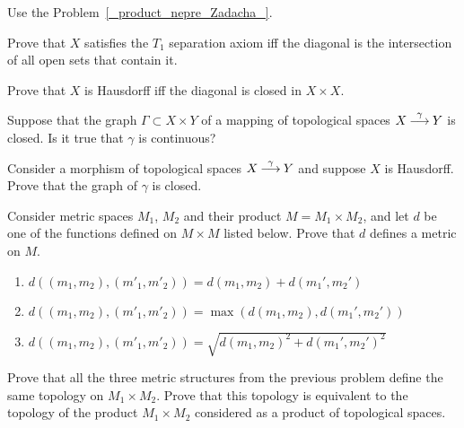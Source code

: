 \documentclass[12pt]{article}
\begin{document}
\begin{ukazanie}
Use the Problem~\ref{_product_nepre_Zadacha_}.
\end{ukazanie}

\begin{zadacha}
Prove that $X$ satisfies the $T_1$ separation axiom iff the diagonal
is the intersection of all open sets that contain it.
\end{zadacha}

\begin{zadacha}[!]
Prove that $X$ is Hausdorff iff the diagonal is closed in $X\times
X$. 
\end{zadacha}

\begin{zadacha}[*]
Suppose that the graph $\Gamma\subset X\times Y$ of a mapping of
topological spaces $X\overset{\gamma}{{\:\longrightarrow\:}} Y$ is closed. Is it true
that $\gamma$ is continuous?
\end{zadacha}

\begin{zadacha}[!]
  Consider a morphism of topological spaces $X\overset{\gamma}{{\:\longrightarrow\:}}
  Y$ and suppose $X$ is Hausdorff. Prove that the graph of $\gamma$ is
  closed.
\end{zadacha}

\begin{zadacha} 
Consider metric spaces $M_1$, $M_2$ and their product $M=M_1\times
M_2$, and let $d$ be one of the functions defined on $M\times M$
listed below. Prove that $d$ defines a metric on $M$.
\begin{enumerate}
\item $d((m_1, m_2), (m'_1, m'_2)) = d(m_1, m_2) + d(m_1', m_2')$

\item $d((m_1, m_2), (m'_1, m'_2)) = \max(d(m_1, m_2), d(m_1', m_2'))$

\item\shrk{} $d((m_1, m_2), (m'_1, m'_2)) = \sqrt{d(m_1,
m_2)^2+d(m_1', m_2')^2}$
\end{enumerate}
\end{zadacha}

\begin{zadacha}[!] 
  Prove that all the three metric structures from the previous problem
  define the same topology on $M_1\times M_2$. Prove that this
  topology is equivalent to the topology of the product $M_1\times
  M_2$ considered as a product of topological spaces.
\end{zadacha}
\end{document}
